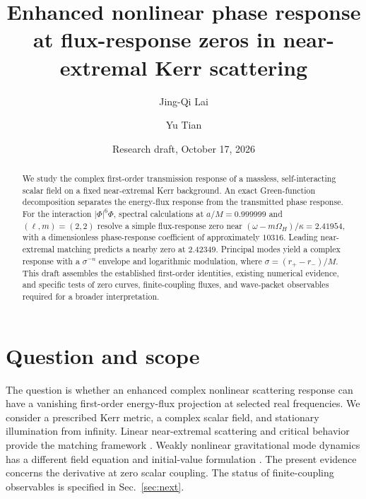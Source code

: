 \documentclass[aps,prd,twocolumn,10pt,nofootinbib,superscriptaddress,floatfix]{revtex4-2}
\begin{document}
\title{Enhanced nonlinear phase response at flux-response zeros in near-extremal Kerr scattering}
\author{Jing-Qi Lai}
\author{Yu Tian}
\date{Research draft, October 17, 2026}
\begin{abstract}
We study the complex first-order transmission response of a massless,
self-interacting scalar field on a fixed near-extremal Kerr background.
An exact Green-function decomposition separates the energy-flux response
from the transmitted phase response. For the interaction $|\Phi|^6\Phi$,
spectral calculations at $a/M=0.999999$ and $(\ell,m)=(2,2)$ resolve a
simple flux-response zero near $(\omega-m\Omega_H)/\kappa=2.41954$,
with a dimensionless phase-response coefficient of approximately $10316$.
Leading near-extremal matching predicts a nearby zero at $2.42349$.
Principal modes yield a complex response with a $\sigma^{-n}$ envelope
and logarithmic modulation, where $\sigma=(r_+-r_-)/M$.
This draft assembles the established first-order identities, existing
numerical evidence, and specific tests of zero curves, finite-coupling
fluxes, and wave-packet observables required for a broader interpretation.
\end{abstract}
\maketitle

\section{Question and scope}
The question is whether an enhanced complex nonlinear scattering response
can have a vanishing first-order energy-flux projection at selected real
frequencies. We consider a prescribed Kerr metric, a complex scalar field,
and stationary illumination from infinity. Linear near-extremal scattering
and critical behavior provide the matching framework
\cite{Bredberg,GrallaTransient,GrallaCritical}.
Weakly nonlinear gravitational mode dynamics has a different field equation
and initial-value formulation \cite{Weather}.
The present evidence concerns the derivative at zero scalar coupling.
The status of finite-coupling observables is specified in Sec.~\ref{sec:next}.
\end{document}

